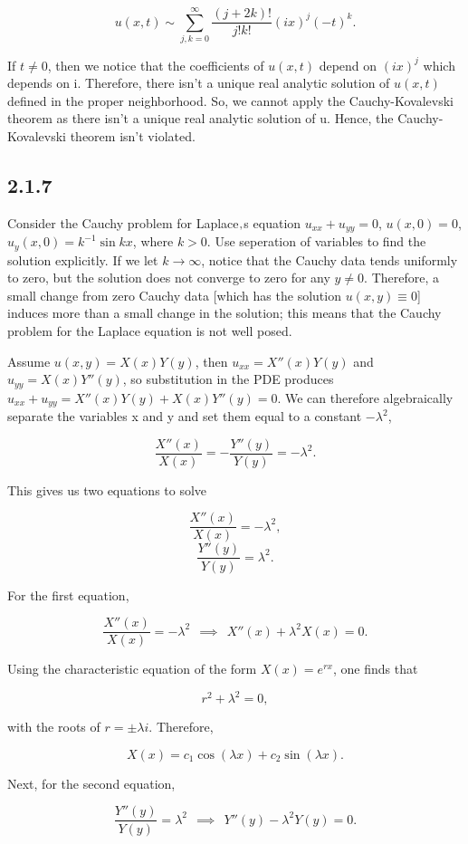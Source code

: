 \documentclass{article}
\begin{document}
\begin{flushleft}
$$u(x,t)\sim \sum_{j,k=0}^\infty \frac{(j+2k)!}{j!k!}(ix)^j(-t)^k.$$

If $t\neq0$, then we notice that the coefficients of $u(x,t)$ depend on $(ix)^j$ which depends on i. Therefore, there isn't a unique real analytic solution of $u(x,t)$ defined in the proper neighborhood. So, we cannot apply the Cauchy-Kovalevski theorem as there isn't a unique real analytic solution of u. Hence, the Cauchy-Kovalevski theorem isn't violated.

\subsection{\textbf{2.1.7}} Consider the Cauchy problem for Laplace$\textsc{\char13}$s equation $u_{xx}+u_{yy}=0$, $u(x,0)=0$, $u_y(x,0)=k^{-1}\sin{kx}$, where $k>0$. Use seperation of variables to find the solution explicitly. If we let $k\to\infty$, notice that the Cauchy data tends uniformly to zero, but the solution does not converge to zero for any $y \neq 0$. Therefore, a small change from zero Cauchy data [which has the solution $u(x,y)\equiv 0$] induces more than a small change in the solution; this means that the Cauchy problem for the Laplace equation is not well posed.

Assume $u(x,y)=X(x)Y(y)$, then $u_{xx}=X''(x)Y(y)$ and $u_{yy}=X(x)Y''(y)$, so substitution in the PDE produces $u_{xx}+u_{yy} = X''(x)Y(y) + X(x)Y''(y) = 0$. We can therefore algebraically separate the variables x and y and set them equal to a constant $-\lambda^2$,

$$\frac{X''(x)}{X(x)}=-\frac{Y''(y)}{Y(y)}=-\lambda^2.$$

This gives us two equations to solve

$$\frac{X''(x)}{X(x)}=-\lambda^2,$$
$$\frac{Y''(y)}{Y(y)}=\lambda^2.$$

For the first equation,

$$\frac{X''(x)}{X(x)}=-\lambda^2 ~~\implies~~ X''(x) + \lambda^2{X(x)} = 0.$$

Using the characteristic equation of the form $X(x)=e^{rx}$, one finds that

$$r^2 + \lambda^2 = 0,$$

with the roots of $r=\pm \lambda i$. Therefore,

$$X(x)=c_1\cos{(\lambda x)} + c_2\sin{(\lambda x)}.$$

Next, for the second equation,

$$\frac{Y''(y)}{Y(y)}=\lambda^2  ~~\implies~~  Y''(y) - \lambda^2{Y(y)} = 0.$$


\end{flushleft}
\end{document}
